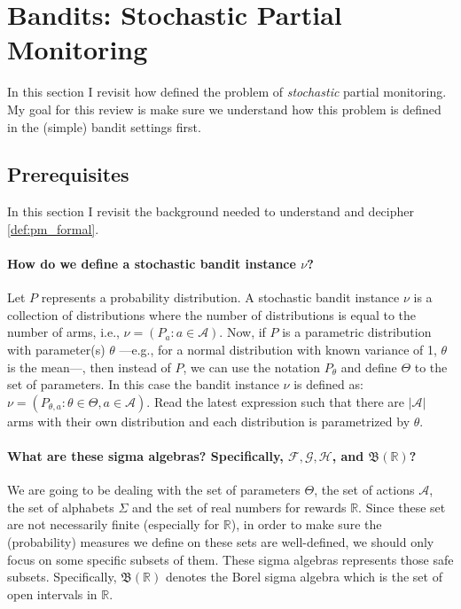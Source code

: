 \documentclass[a4paper]{article}
\theoremstyle{definition}
\newcommand{\cA}{\mathcal{A}}
\newcommand{\cF}{\mathcal{F}}
\newcommand{\cG}{\mathcal{G}}
\newcommand{\cH}{\mathcal{H}}
\newcommand{\fB}{\mathfrak{B}}
\newcommand{\R}{\mathbb{R}}
\begin{document}
\section{Bandits: Stochastic Partial Monitoring}
In this section I revisit how \citet{lattimore2020bandit} defined the problem of \emph{stochastic} partial monitoring. My goal for this review is make sure we understand how this problem is defined in the (simple) bandit settings first.
\subsection{Prerequisites}
In this section I revisit the background needed to understand and decipher \cref{def:pm_formal}.
%
\paragraph{How do we define a stochastic bandit instance $\nu$?}

Let $P$ represents a probability distribution. A stochastic bandit instance $\nu$ is a collection of distributions where the number of distributions is equal to the number of arms, i.e., $\nu = (P_a: a \in \cA)$. Now, if $P$ is a parametric distribution with parameter(s) $\theta$ ---e.g., for a normal distribution with known variance of 1, $\theta$ is the mean---, then instead of $P$, we can use the notation $P_\theta$ and define $\Theta$ to the set of parameters. In this case the bandit instance $\nu$ is defined as: $\nu = (P_{\theta, a}: \theta \in \Theta, a \in \cA)$. Read the latest expression such that there are $|\cA|$ arms with their own distribution and each distribution is parametrized by $\theta$.

\paragraph{What are these sigma algebras? Specifically, $\cF, \cG, \cH$, and $\fB(\R)$?}

We are going to be dealing with the set of parameters $\Theta$, the set of actions $\cA$, the set of alphabets $\Sigma$ and the set of real numbers for rewards $\R$. Since these set are not necessarily finite (especially for $\R$), in order to make sure the (probability) measures we define on these sets are well-defined, we should only focus on some specific subsets of them. These sigma algebras represents those safe subsets. Specifically, $\fB(\R)$ denotes the Borel sigma algebra which is the set of open intervals in $\R$.
    
\end{document}
